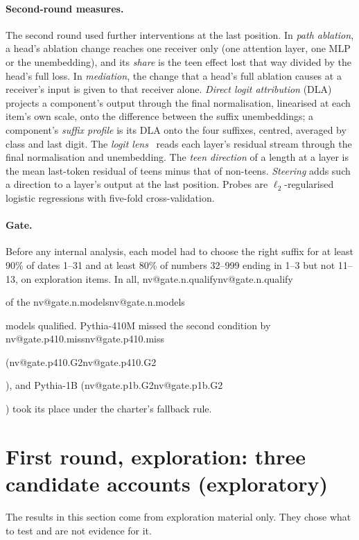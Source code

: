 \documentclass[11pt]{article}
\makeatletter
\newcommand{\nv}[1]{\ifcsname nv@#1\endcsname\csname nv@#1\endcsname\else\PackageError{numbers}{Unknown number key #1}{}\fi}
\makeatother
\begin{document}
\paragraph{Second-round measures.} The second round used further interventions at the last position. In \emph{path ablation}, a head's ablation change reaches one receiver only (one attention layer, one MLP or the unembedding), and its \emph{share} is the teen effect lost that way divided by the head's full loss. In \emph{mediation}, the change that a head's full ablation causes at a receiver's input is given to that receiver alone. \emph{Direct logit attribution} (DLA) projects a component's output through the final normalisation, linearised at each item's own scale, onto the difference between the suffix unembeddings; a component's \emph{suffix profile} is its DLA onto the four suffixes, centred, averaged by class and last digit. The \emph{logit lens}~\citep{belrose2023tuned} reads each layer's residual stream through the final normalisation and unembedding. The \emph{teen direction} of a length at a layer is the mean last-token residual of teens minus that of non-teens. \emph{Steering} adds such a direction to a layer's output at the last position. Probes are $\ell_2$-regularised logistic regressions with five-fold cross-validation.

\paragraph{Gate.} Before any internal analysis, each model had to choose the right suffix for at least 90\% of dates 1--31 and at least 80\% of numbers 32--999 ending in 1--3 but not 11--13, on exploration items. In all, \nv{gate.n.qualify} of the \nv{gate.n.models} models qualified. Pythia-410M missed the second condition by \nv{gate.p410.miss} (\nv{gate.p410.G2}), and Pythia-1B (\nv{gate.p1b.G2}) took its place under the charter's fallback rule.

\section{First round, exploration: three candidate accounts (exploratory)}
\label{sec:explore}

The results in this section come from exploration material only. They chose what to test and are not evidence for it.
\end{document}

